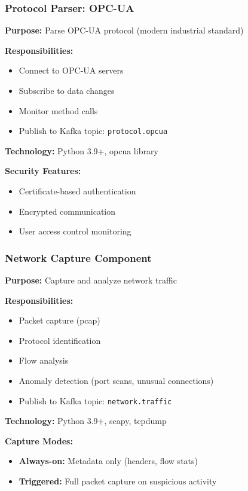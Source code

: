 \documentclass[12pt,a4paper]{article}
\begin{document}
\subsubsection{Protocol Parser: OPC-UA}

\textbf{Purpose:} Parse OPC-UA protocol (modern industrial standard)

\textbf{Responsibilities:}
\begin{itemize}[leftmargin=1cm,itemsep=0pt]
    \item Connect to OPC-UA servers
    \item Subscribe to data changes
    \item Monitor method calls
    \item Publish to Kafka topic: \texttt{protocol.opcua}
\end{itemize}

\textbf{Technology:} Python 3.9+, opcua library

\textbf{Security Features:}
\begin{itemize}[leftmargin=1cm,itemsep=0pt]
    \item Certificate-based authentication
    \item Encrypted communication
    \item User access control monitoring
\end{itemize}

\subsubsection{Network Capture Component}

\textbf{Purpose:} Capture and analyze network traffic

\textbf{Responsibilities:}
\begin{itemize}[leftmargin=1cm,itemsep=0pt]
    \item Packet capture (pcap)
    \item Protocol identification
    \item Flow analysis
    \item Anomaly detection (port scans, unusual connections)
    \item Publish to Kafka topic: \texttt{network.traffic}
\end{itemize}

\textbf{Technology:} Python 3.9+, scapy, tcpdump

\textbf{Capture Modes:}
\begin{itemize}[leftmargin=1cm,itemsep=0pt]
    \item \textbf{Always-on:} Metadata only (headers, flow stats)
    \item \textbf{Triggered:} Full packet capture on suspicious activity
\end{itemize}
\end{document}
